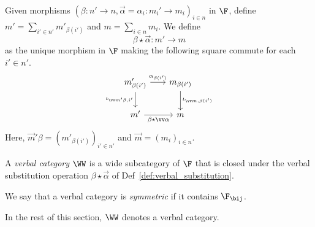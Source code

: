 \documentclass[11pt]{article}
\begin{document}
\begin{definition}
  \label{def:verbal_substitution}
  Given morphisms $(\beta : n' \to n, \vec \alpha = \alpha_i : m_i' \to m_i)_{i \in n}$ in $\F$, define $m' = \sum_{i' \in n'} m'_{\beta(i')}$ and $m = \sum_{i \in n} m_i$. We define \[\beta \star \vec \alpha : m' \to m\] as the unique morphism in $\F$ making the following square commute for each $i' \in n'$.
  \[\begin{tikzcd}[column sep=scriptsize]
    {m'_{\beta(i')}} & {m_{\beta(i')}} \\
    {m'} & m
    \arrow["{\alpha_{\beta(i')}}", from=1-1, to=1-2]
    \arrow["{\iota_{\vec m'\beta, i'}}"', from=1-1, to=2-1]
    \arrow["{\iota_{\vec m, \beta(i')}}", from=1-2, to=2-2]
    \arrow["{\beta \star \vec \alpha}"', from=2-1, to=2-2]
  \end{tikzcd}\]
  Here, $\vec m' \beta = (m'_{\beta(i')})_{i' \in n'}$ and $\vec m = (m_i)_{i \in n}$.
\end{definition}

\begin{definition}
  A \emph{verbal category} $\WW$ is a wide subcategory of $\F$ that is closed under the verbal substitution operation $\beta \star \vec \alpha$ of Def~\ref{def:verbal_substitution}.

  We say that a verbal category is \emph{symmetric} if it contains $\F_{\bij}$.
\end{definition}

In the rest of this section, $\WW$ denotes a verbal category.

\begin{definition}
\end{definition}


\nocite{*}
\printbibliography
\end{document}
